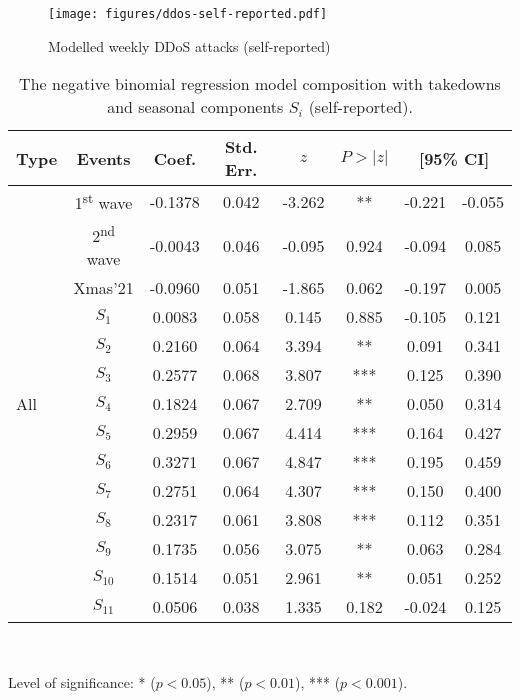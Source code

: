 \documentclass[letterpaper,twocolumn,10pt]{article}
\begin{document}
\begin{figure}[t]
    \centering
    \texttt{[image: figures/ddos-self-reported.pdf]}\\
    \caption{Modelled weekly DDoS attacks (self-reported)}
    \label{fig:self-reported-ddos-attacks}
\end{figure}
\begin{table}[t]
\centering
\vspace{-4mm}
\caption{The negative binomial regression model composition with takedowns and seasonal components $S_i$ (self-reported).}
\setlength{\tabcolsep}{0.225em}
\vspace{2mm}
\small
\begin{tabular}{lccccccc}
    \toprule
    Type & Events & Coef. & Std. Err. & $z$ & $P>|z|$ & \multicolumn{2}{c}{[95\% CI]}\\
    \midrule
    \multirow{15}{*}{All} & 1\textsuperscript{st} wave & -0.1378 &  0.042 & -3.262 &  ** &  -0.221 &  -0.055\\
    & 2\textsuperscript{nd} wave & -0.0043 &  0.046 & -0.095 &  0.924 &  -0.094 &   0.085\\
    & Xmas'21 & -0.0960 &  0.051 & -1.865 &  0.062 &  -0.197 &   0.005\\
    & $S_{1}$ &   0.0083 &  0.058 &  0.145 &  0.885 &  -0.105 &   0.121\\
    & $S_{2}$ &   0.2160 &  0.064 &  3.394 &  ** &   0.091 &   0.341\\
    & $S_{3}$ &   0.2577 &  0.068 &  3.807 &  *** &   0.125 &   0.390\\
    & $S_{4}$ &   0.1824 &  0.067 &  2.709 &  ** &   0.050 &   0.314\\
    & $S_{5}$ &   0.2959 &  0.067 &  4.414 &  *** &   0.164 &   0.427\\
    & $S_{6}$ &   0.3271 &  0.067 &  4.847 &  *** &   0.195 &   0.459\\
    & $S_{7}$ &   0.2751 &  0.064 &  4.307 &  *** &   0.150 &   0.400\\
    & $S_{8}$ &   0.2317 &  0.061 &  3.808 &  *** &   0.112 &   0.351\\
    & $S_{9}$ &   0.1735 &  0.056 &  3.075 &  ** &   0.063 &   0.284\\
    & $S_{10}$ &  0.1514 &  0.051 &  2.961 &  ** &   0.051 &   0.252\\
    & $S_{11}$ &  0.0506 &  0.038 &  1.335 &  0.182 &  -0.024 &   0.125\\
    \bottomrule
\end{tabular}
\\{\vspace{1mm}\hspace{2mm}\raggedright 
\footnotesize{Level of significance: * ($p < 0.05$), ** ($p < 0.01$), *** ($p < 0.001$).} \par}
\label{tab:nbr-composition-self-report}
\end{table}
\end{document}
